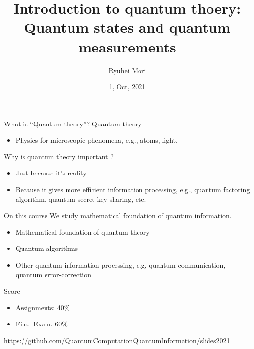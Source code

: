 \documentclass{beamer}
\title{Introduction to quantum thoery: Quantum states and quantum measurements}
\author{Ryuhei Mori}
\institute{Tokyo Institute of Technology}
\date{1, Oct, 2021}
\newcommand\emm[1]{\textcolor{redorange}{{#1}}}
\theoremstyle{definition}
\begin{document}
\begin{frame}[plain]
\maketitle
\end{frame}


\begin{frame}{What is ``Quantum theory''?}
Quantum theory

\vspace{1em}
\begin{itemize}
\item Physics for microscopic phenomena, e.g., atoms, light.
\end{itemize}

\vspace{2em}
Why is quantum theory important ?

\vspace{1em}
\begin{itemize}
\setlength{\itemsep}{2em}
\item Just because it's \emm{reality}.
\item Because it gives more \emm{efficient} information processing, e.g., quantum factoring algorithm, quantum secret-key sharing, etc.
\end{itemize}
\end{frame}

\begin{frame}{On this course}
We study \emm{mathematical foundation} of quantum information.
\begin{itemize}
\setlength{\itemsep}{1em}
\item Mathematical foundation of quantum theory
\item Quantum algorithms
\item Other quantum information processing, e.g, quantum communication, quantum error-correction.
\end{itemize}

\vspace{2em}
Score
\begin{itemize}
\item Assignments: 40\%
\item Final Exam: 60\%
\end{itemize}

\vfill
\small
\url{https://github.com/QuantumComputationQuantumInformation/slides2021}
\end{frame}
\end{document}
